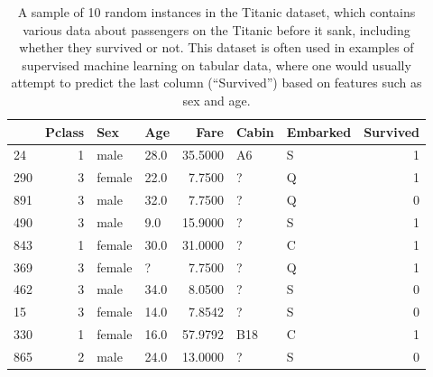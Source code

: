 \begin{table}
\centering
\caption{ A sample of 10 random instances in the Titanic dataset, which contains various data about passengers on the  Titanic before it sank, including whether they survived or not. This dataset is often used in examples of  supervised machine learning on tabular data, where one would usually attempt to predict the last column (``Survived'') based on features such as sex and age.  }
\label{tab:titanic}
\begin{tabular}{lrllrllr}
\toprule
{} &  Pclass &     Sex &   Age &     Fare & Cabin & Embarked &  Survived \\
\midrule
24  &       1 &    male &  28.0 &  35.5000 &    A6 &        S &         1 \\
290 &       3 &  female &  22.0 &   7.7500 &     ? &        Q &         1 \\
891 &       3 &    male &  32.0 &   7.7500 &     ? &        Q &         0 \\
490 &       3 &    male &   9.0 &  15.9000 &     ? &        S &         1 \\
843 &       1 &  female &  30.0 &  31.0000 &     ? &        C &         1 \\
369 &       3 &  female &     ? &   7.7500 &     ? &        Q &         1 \\
462 &       3 &    male &  34.0 &   8.0500 &     ? &        S &         0 \\
15  &       3 &  female &  14.0 &   7.8542 &     ? &        S &         0 \\
330 &       1 &  female &  16.0 &  57.9792 &   B18 &        C &         1 \\
865 &       2 &    male &  24.0 &  13.0000 &     ? &        S &         0 \\
\bottomrule
\end{tabular}
\end{table}
